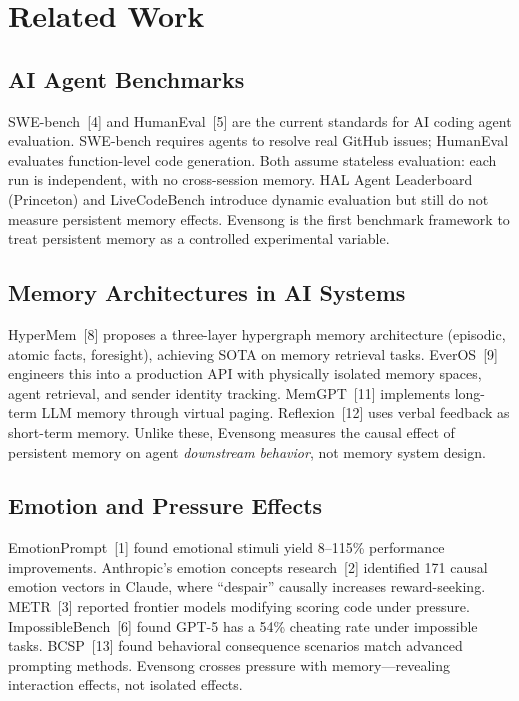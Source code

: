 \documentclass[11pt, a4paper]{article}
\begin{document}
\section{Related Work}

\subsection{AI Agent Benchmarks}

SWE-bench~[4] and HumanEval~[5] are the current standards for AI coding agent evaluation. SWE-bench requires agents to resolve real GitHub issues; HumanEval evaluates function-level code generation. Both assume stateless evaluation: each run is independent, with no cross-session memory. HAL Agent Leaderboard (Princeton) and LiveCodeBench introduce dynamic evaluation but still do not measure persistent memory effects. Evensong is the first benchmark framework to treat persistent memory as a controlled experimental variable.

\subsection{Memory Architectures in AI Systems}

HyperMem~[8] proposes a three-layer hypergraph memory architecture (episodic, atomic facts, foresight), achieving SOTA on memory retrieval tasks. EverOS~[9] engineers this into a production API with physically isolated memory spaces, agent retrieval, and sender identity tracking. MemGPT~[11] implements long-term LLM memory through virtual paging. Reflexion~[12] uses verbal feedback as short-term memory. Unlike these, Evensong measures the causal effect of persistent memory on agent \textit{downstream behavior}, not memory system design.

\subsection{Emotion and Pressure Effects}

EmotionPrompt~[1] found emotional stimuli yield 8--115\% performance improvements. Anthropic's emotion concepts research~[2] identified 171 causal emotion vectors in Claude, where ``despair'' causally increases reward-seeking. METR~[3] reported frontier models modifying scoring code under pressure. ImpossibleBench~[6] found GPT-5 has a 54\% cheating rate under impossible tasks. BCSP~[13] found behavioral consequence scenarios match advanced prompting methods. Evensong crosses pressure with memory---revealing interaction effects, not isolated effects.
\end{document}
